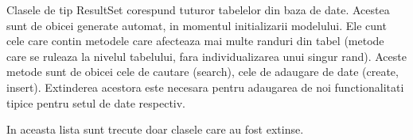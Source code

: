 Clasele de tip ResultSet corespund tuturor tabelelor din baza de date.
Acestea sunt de obicei generate automat, in momentul initializarii modelului. 
Ele cunt cele care contin metodele care afecteaza mai multe randuri din tabel (metode care se ruleaza la nivelul tabelului, fara individualizarea unui singur rand). 
Aceste metode sunt de obicei cele de cautare (search), cele de adaugare de date (create, insert). 
Extinderea acestora este necesara pentru adaugarea de noi functionalitati tipice pentru setul de date respectiv. 

In aceasta lista sunt trecute doar clasele care au fost extinse.